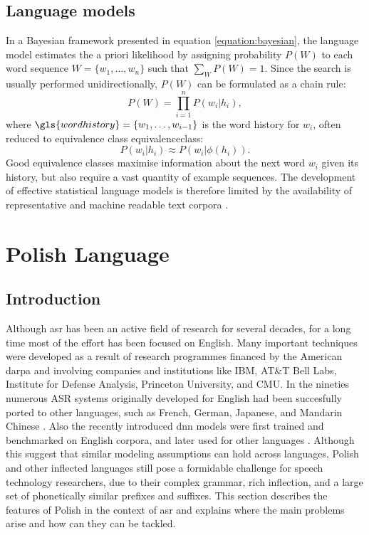 \subsection{Language models}
\label{subsection:lm}
 In a Bayesian framework presented in equation \ref{equation:bayesian}, the language model estimates the a priori likelihood by assigning probability $P(W)$ to each word sequence $W=\{w_{1}, \ldots, w_{n}\}$ such that $\sum_{W}P(W)=1$. Since the search is usually performed unidirectionally, $P(W)$ can be formulated as a chain rule:
\begin{equation}
  P(W)=\prod^{n}_{i=1}P(w_{i}|h_{i}),
\end{equation}
where $\gls{wordhistory}=\{w_{1}, \ldots, w_{i-1}\}$ is the word history for $w_{i}$, often reduced to equivalence class \gls{equivalenceclass}:
\begin{equation}
  P(w_{i}|h_{i})\approx P(w_{i}|\phi(h_{i})).
\end{equation}
Good equivalence classes maximise information about the next word $w_{i}$ given its history, but also require a vast quantity of example sequences. The development of effective statistical language models is therefore limited by the availability of representative and machine readable text corpora \cite{rosenfeld2000two}.

\section{Polish Language}
\label{section:polish}
\subsection{Introduction}
Although \gls{asr} has been an active field of research for several decades, for a long time most of the effort has been focused on English.  Many important techniques were developed as a result of research programmes financed by the American \gls{darpa} and involving companies and institutions like IBM, AT\&T Bell Labs, Institute for Defense Analysis, Princeton University, and CMU. In the nineties numerous ASR systems originally developed for English had been succesfully ported to other languages, such as French, German, Japanese, and Mandarin Chinese \cite{besacier2014automatic}. Also the recently introduced \gls{dnn} models were first trained and benchmarked on English corpora, and later used for other languages \cite{hinton2012deep}. Although this suggest that similar modeling assumptions can hold across languages, Polish and other inflected languages still pose a formidable challenge for speech technology researchers, due to their complex grammar, rich inflection, and a large set of phonetically similar prefixes and suffixes. This section describes the features of Polish in the context of \gls{asr} and explains where the main problems arise and how can they can be tackled.
